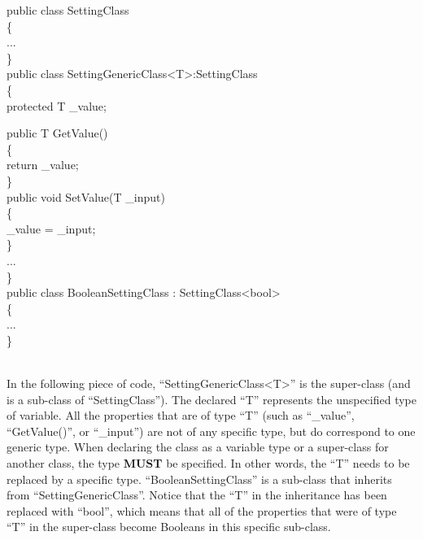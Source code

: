 \begin{codefont}

public class SettingClass\\
\{\\
\tab ...\\
\}\\

public class SettingGenericClass<T>:SettingClass\\
\{\\
\tab protected T \_value; %

\tab public T GetValue()\\%
\tab \{\\
\tab \tab return \_value;\\
\tab \}\\

\tab public void SetValue(T \_input)\\%
\tab \{\\
\tab \tab \_value = \_input;\\
\tab \}\\
\tab ...\\
\}\\

public class BooleanSettingClass : SettingClass<bool>\\
\{\\
\tab ...\\
\}\\
\end{codefont}\\
In the following piece of code, “{\codefont SettingGenericClass<T>}” is the super-class (and is a sub-class of “{\codefont SettingClass}”). The declared “{\codefont T}” represents the unspecified type of variable. All the properties that are of type “{\codefont T}” (such as “{\codefont \_value}”, “{\codefont GetValue()}”, or “{\codefont \_input}”) are not of any specific type, but do correspond to one generic type. When declaring the class as a variable type or a super-class for another class, the type \textbf{MUST} be specified. In other words, the “{\codefont T}” needs to be replaced by a specific type. “{\codefont BooleanSettingClass}” is a sub-class that inherits from “{\codefont SettingGenericClass}”. Notice that the “{\codefont T}” in the inheritance has been replaced with “{\codefont bool}”, which means that all of the properties that were of type “{\codefont T}” in the super-class become Booleans in this specific sub-class.\\

